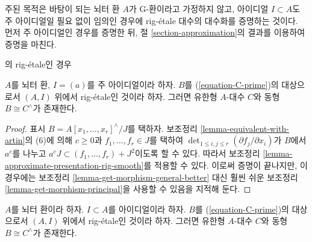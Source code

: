 \noindent
주된 목적은 바탕이 되는 뇌터 환 $A$가 G-환이라고 가정하지 않고,
아이디얼 $I \subset A$도 주 아이디얼일 필요 없이 임의인 경우에
rig-\'etale 대수의 대수화를 증명하는 것이다.
먼저 주 아이디얼인 경우를 증명한 뒤,
절 \ref{section-approximation}의 결과를 이용하여 증명을 마친다.

\begin{lemma}
\label{lemma-approximate-principal}
\begin{reference}
\cite[III Theorem 7]{Elkik}의 rig-\'etale인 경우
\end{reference}
$A$를 뇌터 환, $I = (a)$를 주 아이디얼이라 하자.
$B$를 (\ref{equation-C-prime})의 대상으로서
$(A, I)$ 위에서 rig-\'etale인 것이라 하자.
그러면 유한형 $A$-대수 $C$와 동형 $B \cong C^\wedge$가 존재한다.
\end{lemma}

\begin{proof}
표시 $B = A[x_1, \ldots, x_r]^\wedge/J$를 택하자.
보조정리 \ref{lemma-equivalent-with-artin}의 (6)에 의해
$c \geq 0$과 $f_1, \ldots, f_r \in J$를 택하여
$\det_{1 \leq i, j \leq r}(\partial f_j/\partial x_i)$가 $B$에서
$a^c$를 나누고 $a^c J \subset (f_1, \ldots, f_r) + J^2$이도록 할 수 있다.
따라서 보조정리 \ref{lemma-approximate-presentation-rig-smooth}를 적용할 수 있다.
이로써 증명이 끝나지만, 이 경우에는 보조정리
\ref{lemma-get-morphism-general-better} 대신 훨씬 쉬운 보조정리
\ref{lemma-get-morphism-principal}을 사용할 수 있음을 지적해 둔다.
\end{proof}

\begin{lemma}
\label{lemma-approximate}
$A$를 뇌터 환이라 하자. $I \subset A$를 아이디얼이라 하자.
$B$를 (\ref{equation-C-prime})의 대상으로서
$(A, I)$ 위에서 rig-\'etale인 것이라 하자.
그러면 유한형 $A$-대수 $C$와 동형 $B \cong C^\wedge$가 존재한다.
\end{lemma}

